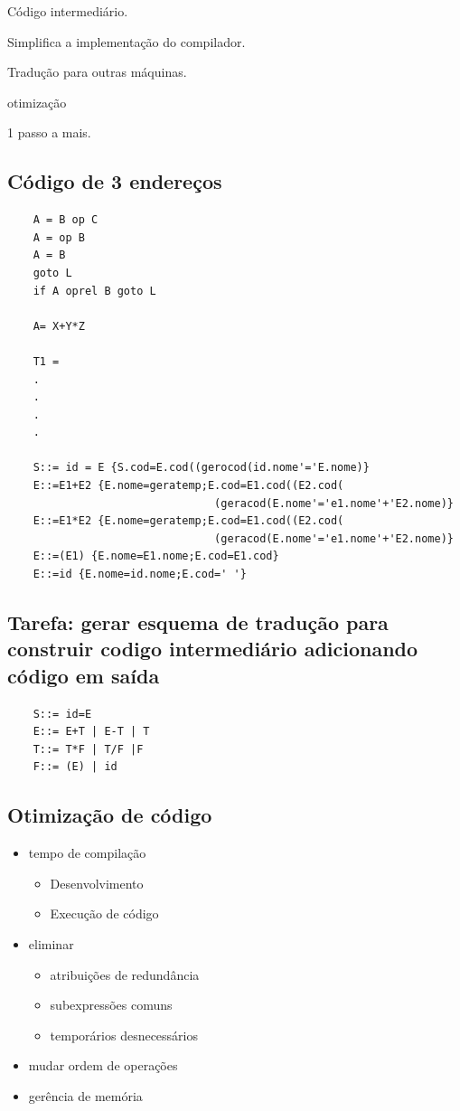 \documentclass[ 12pt, a4paper]{article}
\begin{document}
	Código intermediário.

	Simplifica a implementação do compilador.


	Tradução para outras máquinas.

	otimização

	1 passo a mais.

	\subsection{Código de 3 endereços}

\begin{verbatim}
	A = B op C
	A = op B
	A = B
	goto L
	if A oprel B goto L

	A= X+Y*Z

	T1 = 
	.
	.
	.
	.

	S::= id = E {S.cod=E.cod((gerocod(id.nome'='E.nome)}
	E::=E1+E2 {E.nome=geratemp;E.cod=E1.cod((E2.cod(
				                (geracod(E.nome'='e1.nome'+'E2.nome)}
	E::=E1*E2 {E.nome=geratemp;E.cod=E1.cod((E2.cod(
				                (geracod(E.nome'='e1.nome'+'E2.nome)}
	E::=(E1) {E.nome=E1.nome;E.cod=E1.cod}
	E::=id {E.nome=id.nome;E.cod=' '}
\end{verbatim}
	\subsection{Tarefa: gerar esquema de tradução para construir codigo intermediário adicionando código em saída}
\begin{verbatim}
	S::= id=E
	E::= E+T | E-T | T
	T::= T*F | T/F |F
	F::= (E) | id
\end{verbatim}

	\subsection{Otimização de código}
		\begin{itemize}
			\item tempo de compilação
				\begin{itemize}
					\item Desenvolvimento
					\item Execução de código
				\end{itemize}
			\item eliminar
				\begin{itemize}
					\item atribuições de redundância
					\item subexpressões comuns
					\item temporários desnecessários
				\end{itemize}
			\item mudar ordem de operações
			\item gerência de memória
		\end{itemize}
\end{document}
